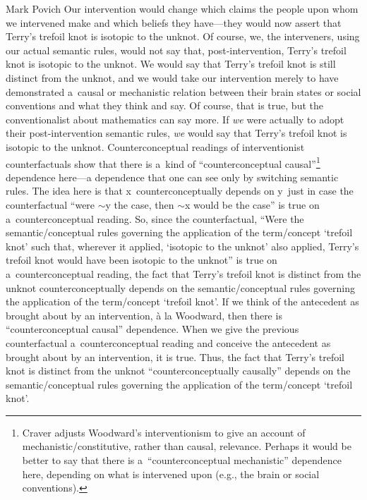 \begin{artengenv}{Mark Povich}
Our intervention would change which claims the people upon whom we intervened make and which beliefs they have---they would now assert that Terry's trefoil knot is isotopic to the unknot. Of course, we, the interveners, using our actual semantic rules, would not say that, post-intervention, Terry's trefoil knot is isotopic to the unknot. We would say that Terry's trefoil knot is still distinct from the unknot, and we would take our intervention merely to have demonstrated a~causal or mechanistic relation between their brain states or social conventions and what they think and say. Of course, that is true, but the conventionalist about mathematics can say more. If \textit{we} were actually to adopt their post-intervention semantic rules, \textit{we} would say that Terry's trefoil knot is isotopic to the unknot. Counterconceptual readings of interventionist counterfactuals show that there is a~kind of ``counterconceptual causal''\footnote{Craver
\parencites*[][]{Craver2007}[][]{craver_constitutive_2021} %
 adjusts Woodward's interventionism to give an account of mechanistic/constitutive, rather than causal, relevance. Perhaps it would be better to say that there is a~``counterconceptual mechanistic'' dependence here, depending on what is intervened upon (e.g., the brain or social conventions).} dependence here---a dependence that one can see only by switching semantic rules. The idea here is that x~counterconceptually depends on y~just in case the counterfactual ``were ${\sim}$y the case, then ${\sim}$x would be the case'' is true on a~counterconceptual reading. So, since the counterfactual, ``Were the semantic/conceptual rules governing the application of the term/concept ‘trefoil knot' such that, wherever it applied, ‘isotopic to the unknot' also applied, Terry's trefoil knot would have been isotopic to the unknot'' is true on a~counterconceptual reading, the fact that Terry's trefoil knot is distinct from the unknot counterconceptually depends on the semantic/conceptual rules governing the application of the term/concept ‘trefoil knot'. If we think of the antecedent as brought about by an intervention, à la Woodward, then there is ``counterconceptual causal'' dependence. When we give the previous counterfactual a~counterconceptual reading and conceive the antecedent as brought about by an intervention, it is true. Thus, the fact that Terry's trefoil knot is distinct from the unknot ``counterconceptually causally'' depends on the semantic/conceptual rules governing the application of the term/concept ‘trefoil knot'.


\end{artengenv}
